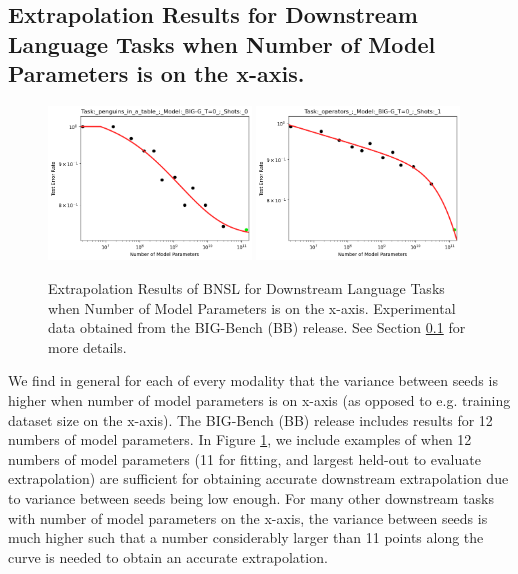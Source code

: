 \documentclass{article} %
\begin{document}
\FloatBarrier

\iffalse

\subsection{Extrapolation Results for Downstream Language Tasks when Number of Model Parameters is on the x-axis.}
\label{section:language_tasks__number_of_parameters}

\begin{figure}[htbp]
    \centering
\includegraphics[width=0.48\textwidth]{figures/big_bench__parameter_scalling/penguins_in_a_table___BIG-G_T=0___0.png}
\includegraphics[width=0.48\textwidth]{figures/big_bench__parameter_scalling/operators___BIG-G_T=0___1.png}
    \caption{
Extrapolation Results of BNSL for Downstream Language Tasks when Number of Model Parameters is on the x-axis. Experimental data obtained from the BIG-Bench (BB) \citep{srivastava2022beyond} release.
See Section \ref{section:language_tasks__number_of_parameters} for more details.
    }
    \label{fig:language_tasks__number_of_parameters}
\end{figure}

We find in general for each of every modality that the variance between seeds is higher when number of model parameters is on x-axis (as opposed to e.g. training dataset size on the x-axis). The BIG-Bench (BB) \citep{srivastava2022beyond} release includes results for 12 numbers of model parameters. In Figure \ref{fig:language_tasks__number_of_parameters}, we include examples of when 12 numbers of model parameters (11 for fitting, and largest held-out to evaluate extrapolation)
are sufficient for obtaining accurate downstream extrapolation due to variance between seeds being low enough. For many other downstream tasks with number of model parameters on the x-axis, the variance between seeds is much higher such that a number considerably larger than 11 points along the curve is needed to obtain an accurate extrapolation.
\end{document}
